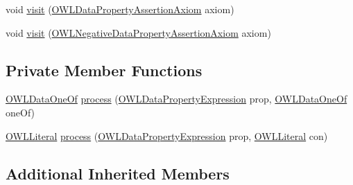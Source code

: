 \begin{DoxyCompactItemize}
\item 
void \hyperlink{classorg_1_1semanticweb_1_1owlapi_1_1_coerce_constants_into_data_property_range_1_1_o_w_l_constant_replacer_a0ea6dd35624c2bde19edcdee61d7d93b}{visit} (\hyperlink{interfaceorg_1_1semanticweb_1_1owlapi_1_1model_1_1_o_w_l_data_property_assertion_axiom}{O\-W\-L\-Data\-Property\-Assertion\-Axiom} axiom)
\item 
void \hyperlink{classorg_1_1semanticweb_1_1owlapi_1_1_coerce_constants_into_data_property_range_1_1_o_w_l_constant_replacer_ab21ba3cc27cfd7fe7b13ac8a9b21dbb2}{visit} (\hyperlink{interfaceorg_1_1semanticweb_1_1owlapi_1_1model_1_1_o_w_l_negative_data_property_assertion_axiom}{O\-W\-L\-Negative\-Data\-Property\-Assertion\-Axiom} axiom)
\end{DoxyCompactItemize}
\subsection*{Private Member Functions}
\begin{DoxyCompactItemize}
\item 
\hyperlink{interfaceorg_1_1semanticweb_1_1owlapi_1_1model_1_1_o_w_l_data_one_of}{O\-W\-L\-Data\-One\-Of} \hyperlink{classorg_1_1semanticweb_1_1owlapi_1_1_coerce_constants_into_data_property_range_1_1_o_w_l_constant_replacer_afd46a691a41ee293149162f126cef789}{process} (\hyperlink{interfaceorg_1_1semanticweb_1_1owlapi_1_1model_1_1_o_w_l_data_property_expression}{O\-W\-L\-Data\-Property\-Expression} prop, \hyperlink{interfaceorg_1_1semanticweb_1_1owlapi_1_1model_1_1_o_w_l_data_one_of}{O\-W\-L\-Data\-One\-Of} one\-Of)
\item 
\hyperlink{interfaceorg_1_1semanticweb_1_1owlapi_1_1model_1_1_o_w_l_literal}{O\-W\-L\-Literal} \hyperlink{classorg_1_1semanticweb_1_1owlapi_1_1_coerce_constants_into_data_property_range_1_1_o_w_l_constant_replacer_a86b4c461c2bf034c784c0d191be01e97}{process} (\hyperlink{interfaceorg_1_1semanticweb_1_1owlapi_1_1model_1_1_o_w_l_data_property_expression}{O\-W\-L\-Data\-Property\-Expression} prop, \hyperlink{interfaceorg_1_1semanticweb_1_1owlapi_1_1model_1_1_o_w_l_literal}{O\-W\-L\-Literal} con)
\end{DoxyCompactItemize}
\subsection*{Additional Inherited Members}


